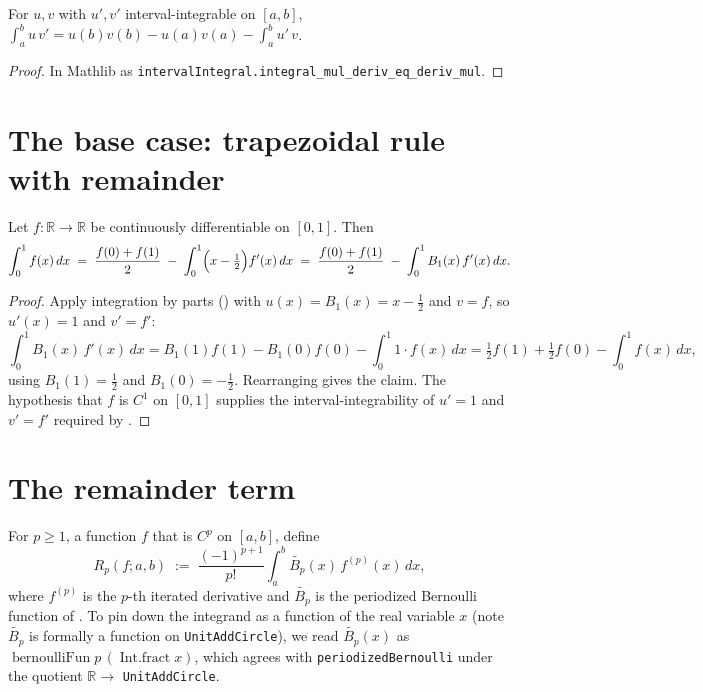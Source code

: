 \begin{theorem}
\label{thm:ibp}
\leanok
For $u, v$ with $u', v'$ interval-integrable on $[a,b]$,
$\int_a^b u\,v' = u(b)v(b) - u(a)v(a) - \int_a^b u'\,v$.
\end{theorem}

\begin{proof}
\leanok
In Mathlib as \texttt{intervalIntegral.integral\_mul\_deriv\_eq\_deriv\_mul}.
\end{proof}

\section{The base case: trapezoidal rule with remainder}
\label{sec:em_base}

\begin{lemma}
\label{lem:em_step}
\leanok
{}
Let $f : \mathbb{R} \to \mathbb{R}$ be continuously differentiable on $[0,1]$.
Then
\[
  \int_0^1 f(x)\,dx
    \;=\; \frac{f(0)+f(1)}{2} \;-\; \int_0^1 \Bigl(x-\tfrac12\Bigr) f'(x)\,dx
    \;=\; \frac{f(0)+f(1)}{2} \;-\; \int_0^1 B_1(x)\,f'(x)\,dx .
\]
\end{lemma}

\begin{proof}
\leanok
{}
Apply integration by parts () with $u(x) = B_1(x) = x-\tfrac12$ and
$v = f$, so $u'(x) = 1$ and $v' = f'$:
\[
  \int_0^1 B_1(x)\,f'(x)\,dx
  = B_1(1)f(1) - B_1(0)f(0) - \int_0^1 1\cdot f(x)\,dx
  = \tfrac12 f(1) + \tfrac12 f(0) - \int_0^1 f(x)\,dx,
\]
using $B_1(1) = \tfrac12$ and $B_1(0) = -\tfrac12$. Rearranging gives the claim.
The hypothesis that $f$ is $C^1$ on $[0,1]$ supplies the interval-integrability of
$u'=1$ and $v'=f'$ required by .
\end{proof}

\section{The remainder term}
\label{sec:em_remainder}

\begin{definition}
\label{def:em_remainder}
\leanok
{}
For $p \ge 1$, a function $f$ that is $C^p$ on $[a,b]$, define
\[
  R_p(f; a, b) \;:=\; \frac{(-1)^{p+1}}{p!}\int_a^b \widetilde{B_p}(x)\, f^{(p)}(x)\,dx,
\]
where $f^{(p)}$ is the $p$-th iterated derivative and $\widetilde{B_p}$ is the
periodized Bernoulli function of . To pin down the
integrand as a function of the real variable $x$ (note $\widetilde{B_p}$ is
formally a function on \texttt{UnitAddCircle}), we read $\widetilde{B_p}(x)$ as
$\operatorname{bernoulliFun} p\,(\operatorname{Int.fract} x)$, which agrees with
\texttt{periodizedBernoulli} under the quotient $\mathbb{R} \to$
\texttt{UnitAddCircle}.
\end{definition}

